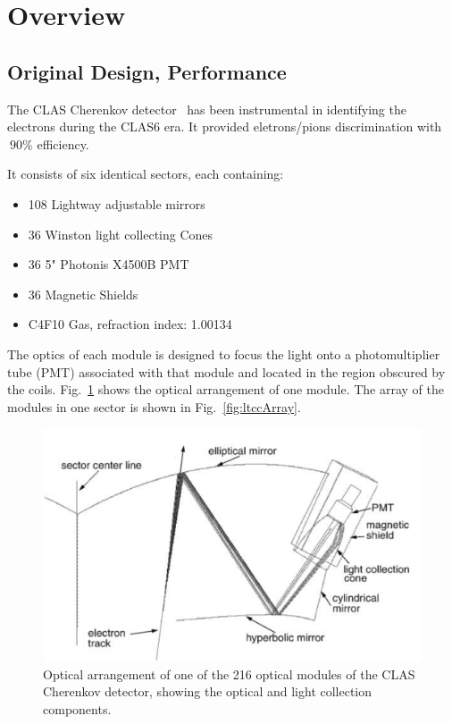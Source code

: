 \section{Overview}



\subsection{Original Design, Performance}

The CLAS Cherenkov detector~\cite{Adams:2001kk} has been instrumental in identifying the electrons during the CLAS6 era.
It provided eletrons/pions discrimination with $~90\%$ efficiency.

It consists of six identical sectors, each containing:

\begin{itemize}
	\item 108 Lightway adjustable mirrors
	\item 36 Winston light collecting Cones
	\item 36 5" Photonis X4500B PMT
	\item 36 Magnetic Shields
	\item C4F10 Gas, refraction index: 1.00134
\end{itemize}


The optics of each module is designed to focus the light onto a photomultiplier tube (PMT) associated with that module and located in the region obscured by the coils.
Fig.~\ref{fig:optics} shows the optical arrangement of one module. The array of the modules in one sector is shown in Fig.~\ref{fig:ltccArray}.

\begin{figure}[h]
	\centering
	\includegraphics[width=1.0\columnwidth,keepaspectratio]{img/optics.png}
	\caption{Optical arrangement of one of the 216 optical modules of the CLAS Cherenkov detector, showing the optical and light collection components.}
	\label{fig:optics}
\end{figure}

